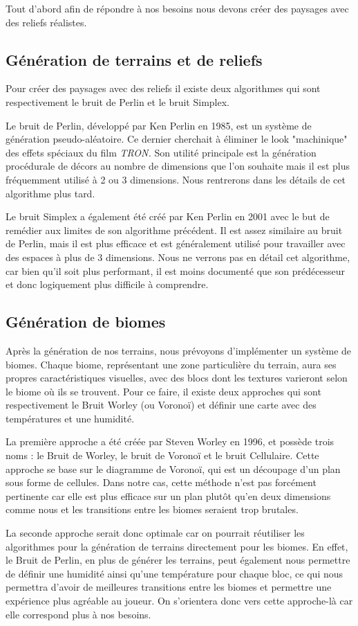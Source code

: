 \documentclass{article}
\begin{document}
Tout d'abord afin de répondre à nos besoins nous devons créer des paysages avec des reliefs réalistes.

\subsection{Génération de terrains et de reliefs}

Pour créer des paysages avec des reliefs il existe deux algorithmes qui sont respectivement le bruit de Perlin et le bruit Simplex.

Le bruit de Perlin, développé par Ken Perlin en 1985, est un système de génération pseudo-aléatoire. Ce dernier cherchait à éliminer le look "machinique" des effets spéciaux du film \textit{TRON.} Son utilité principale est la génération procédurale de décors au nombre de dimensions que l'on souhaite mais il est plus fréquemment utilisé à 2 ou 3 dimensions. Nous rentrerons dans les détails de cet algorithme plus tard.\par
Le bruit Simplex a également été créé par Ken Perlin en 2001 avec le but de remédier aux limites de son algorithme précédent. Il est assez similaire au bruit de Perlin, mais il est plus efficace et est généralement utilisé pour travailler avec des espaces à plus de 3 dimensions. Nous ne verrons pas en détail cet algorithme, car bien qu'il soit plus performant, il est moins documenté que son prédécesseur et donc logiquement plus difficile à comprendre.

\subsection{Génération de biomes}

Après la génération de nos terrains, nous prévoyons d'implémenter un système de biomes. Chaque biome, représentant une zone particulière du terrain, aura ses propres caractéristiques visuelles, avec des blocs dont les textures varieront selon le biome où ils se trouvent. Pour ce faire, il existe deux approches qui sont respectivement le Bruit Worley (ou Voronoï) et définir une carte avec des températures et une humidité.\par
La première approche a été créée par Steven Worley en 1996, et possède trois noms : le Bruit de Worley, le bruit de Voronoï et le bruit Cellulaire. Cette approche se base sur le diagramme de Voronoï, qui est un découpage d'un plan sous forme de cellules. Dans notre cas, cette méthode n'est pas forcément pertinente car elle est plus efficace sur un plan plutôt qu'en deux dimensions comme nous et les transitions entre les biomes seraient trop brutales.\par
La seconde approche serait donc optimale car on pourrait réutiliser les algorithmes pour la génération de terrains directement pour les biomes. En effet, le Bruit de Perlin, en plus de générer les terrains, peut également nous permettre de définir une humidité ainsi qu'une température pour chaque bloc, ce qui nous permettra d'avoir de meilleures transitions entre les biomes et permettre une expérience plus agréable au joueur. On s'orientera donc vers cette approche-là car elle correspond plus à nos besoins. 
\end{document}
